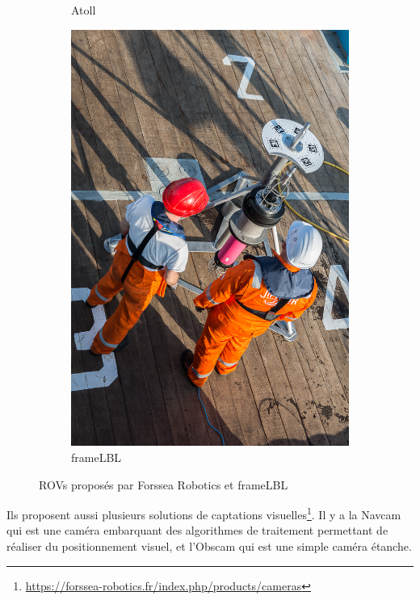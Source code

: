 \begin{figure}[!htb]
\begin{subfigure}[b]{0.3\textwidth}
            \caption{\gls{Atoll}}
        \end{subfigure}
        \hfill
        \begin{subfigure}[b]{0.3\textwidth}
            \centering
            \includegraphics[width=\textwidth]{imgs/Frame.jpg}
            \caption{\gls{frameLBL}}
        \end{subfigure}
        \caption{\gls{ROV}s proposés par Forssea Robotics et \gls{frameLBL}}
        \label{fig:ROVs}
    \end{figure}

    Ils proposent aussi plusieurs solutions de captations visuelles\footnote{\url{https://forssea-robotics.fr/index.php/products/cameras}}. Il y a la \gls{Navcam} qui est une caméra embarquant des algorithmes de traitement permettant de réaliser du positionnement visuel, et l'\gls{Obscam} qui est une simple caméra étanche.